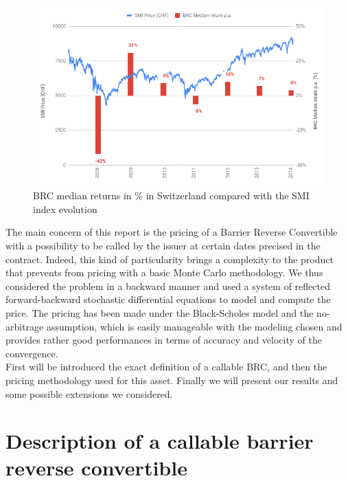 \documentclass[a4paper,11pt,english]{book}
\begin{document}
\begin{figure}[H] 
    \centering
    \includegraphics[scale=0.45]{images/BRC_median_return.png} 
    \caption{BRC median returns in \% in Switzerland compared with the SMI index evolution}
    \label{fig:median-returns-BRC}
\end{figure}

The main concern of this report is the pricing of a Barrier Reverse Convertible with a possibility to be called by the issuer at certain dates precised in the contract. Indeed, this kind of particularity brings a complexity to the product that prevents from pricing with a basic Monte Carlo methodology. We thus considered the problem in a backward manner and used a system of reflected forward-backward stochastic differential equations to model and compute the price. The pricing has been made under the Black-Scholes model and the no-arbitrage assumption, which is easily manageable with the modeling chosen and provides rather good performances in terms of accuracy and velocity of the convergence. \\

First will be introduced the exact definition of a callable BRC, and then the pricing methodology used for this asset. Finally we will present our results and some possible extensions we considered.  




\pagestyle{fancy}

\chapter{Description of a callable barrier reverse convertible}
\end{document}
